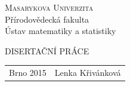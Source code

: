 \documentclass[a4paper,12pt]{report}
\date{\today}
\theoremstyle{definition} \newtheorem{definice}[veta]{Definice}
\theoremstyle{remark}
\begin{document}
\titlepage
\vspace*{-2.4cm}
\begin{center}
\textsc{\Large{Masarykova Univerzita}} \\
\large{Přírodovědecká fakulta} \\
\large{Ústav matematiky a statistiky}
\end{center}
\vspace{7.11cm}
%
\begin{center}
\textsc{\Large{DISERTAČNÍ PRÁCE}}
\end{center}
%
\vspace{11.39cm}
%
\begin{center}
\begin{tabular}{l  r}
 \Large{Brno 2015} \qquad\qquad\qquad\qquad \qquad\qquad & \Large{Lenka Křivánková}
\end{tabular}
\end{center}
\end{document}
